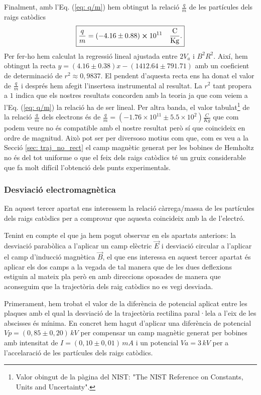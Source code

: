 \documentclass[11pt]{article}
\numberwithin{equation}{section}
\numberwithin{figure}{section}
\numberwithin{table}{section}
\begin{document}
Finalment, amb l'Eq. (\ref{eq: q/m}) hem obtingut la relació $\frac{q}{m}$ de les partícules dels raigs catòdics
\[
\boxed{\frac{q}{m}=(-4.16\pm0.88)\cross10^{11}\quad \mathrm{\frac{C}{Kg}.}}
\]
Per fer-ho hem calculat la regressió lineal ajustada entre $2V_a$ i $B^2R^2$. Així, hem obtingut la recta $y=(4.16\pm0.38)x - (1412.64\pm791.71)$ amb un coeficient de determinació de $r^2\approx0,9837$. El pendent d'aquesta recta ens ha donat el valor de $\frac{q}{m}$ i després hem afegit l'insertesa instrumental al resultat. La $r^2$ tant propera a $1$ indica que els nostres resultats concorden amb la teoria ja que com veiem a l'Eq. (\ref{eq: q/m}) la relació ha de ser lineal. 
Per altra banda, el valor tabulat\footnote{Valor obingut de la pàgina del NIST: "The NIST Reference on Constants, Units and Uncertainty".} de la relació $\frac{q}{m}$ dels electrons és de $\frac{q}{m}=(-1.76\times10^{11}\pm5.5\times10^{2}) \frac{C}{Kg}$ que    com podem veure no és compatible amb el nostre resultat però sí que coincideix en ordre de magnitud. Això pot ser per diversoso motius com que, com es veu a la Secció \ref{sec: traj_no_rect} el camp magnètic generat per les bobines de Hemholtz no és del tot uniforme o que el feix dels raigs catòdics té un gruix considerable que fa molt difícil l'obtenció dels punts experimentals.


\subsubsection{Desviació electromagnètica}\label{sec: desv_em}

En aquest tercer apartat ens interessem la relació càrrega/massa de les partícules dels raigs catòdics per a comprovar que aquesta coincideix amb la de l'electró. 

Tenint en compte el que ja hem pogut observar en els apartats anteriors: la desviació parabòlica a l'aplicar un camp elèctric $\vec{E}$ i desviació circular a l'aplicar el camp d'inducció magnètica $\vec{B}$, el que ens interessa en aquest tercer apartat és aplicar els dos camps a la vegada de tal manera que de les dues deflexions estiguin al mateix pla però en amb direccions oposades de manera que aconseguim que la trajectòria dels raig catòdics no es vegi desviada.

Primerament, hem trobat el valor de la diferència de potencial aplicat entre les plaques amb el qual la desviació de la trajectòria rectilina paral·lela a l'eix de les abscisses és mínima. En concret hem hagut d'aplicar una diferència de potencial $Vp = (0,85 \pm 0,20 )\, kV$ per compensar un camp magnètic generat per bobines amb intensitat de $I = (0,10 \pm 0,01 )\, mA$ i un potencial $Va = 3\, kV$ per a l'accelaració de les partícules dels raigs catòdics.
\end{document}
